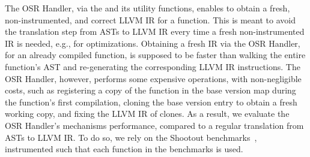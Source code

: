 
The OSR Handler, via the  and its utility functions, enables to obtain a fresh, non-instrumented, and correct LLVM IR for a function.
This is meant to avoid the translation step from ASTs to LLVM IR every time a fresh non-instrumented IR is needed, e.g., for optimizations.
Obtaining a fresh IR via the OSR Handler, for an already compiled function, is supposed to be faster than walking the entire function's AST and re-generating the corresponding LLVM IR instructions.
The OSR Handler, however, performs some expensive operations, with non-negligible costs, such as registering a copy of the function in the base version map during the function's first compilation, cloning the base version entry to obtain a fresh working copy, and fixing the LLVM IR of clones.
As a result, we evaluate the OSR Handler's mechanisms performance, compared to a regular translation from ASTs to LLVM IR.
To do so, we rely on the Shootout benchmarks~\cite{Shootout}, instrumented such that each function in the benchmarks is used.\\

